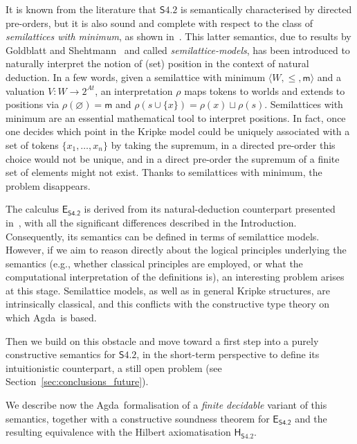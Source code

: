 \documentclass{article}
\newcommand{\logic}{\mathsf{S4.2}}
\newcommand{\eseq}{\mathsf{E}_{{\textsf{S4.2}}}}
\newcommand{\agda}{\textsf{Agda}}
\newcommand{\hilbertlogic}[1]{\mathsf{H}_{#1}}
\theoremstyle{definition}
\begin{document}
It is known from the literature that $\logic$ is semantically characterised by directed pre-orders, but it is also sound and complete with respect to the class of \emph{semilattices with minimum}, as shown in~\cite[Theorem~21]{Martini2024:S42NaturalDeduction}. This latter semantics, due to results by Goldblatt and Shehtmann~\cite{Goldblatt1980:Diodorean, Shehtman1983:ModalDomains} and called \emph{semilattice-models}, has been introduced to naturally interpret the notion of (set) position in the context of natural deduction.
In a few words, given a semilattice with minimum $\langle W, \leq, \mathsf{m} \rangle$ and a valuation $V : W \to 2^{At}$, an interpretation $\rho$ maps tokens to worlds and extends to positions via $\rho(\varnothing) = \mathsf{m}$ and $\rho(s \cup \{x\}) = \rho(x) \sqcup \rho(s)$. Semilattices with minimum are an essential mathematical tool to interpret positions. In fact, once one decides which point in the Kripke model could be uniquely associated with a set of tokens $\{x_1,\ldots,x_n\}$ by taking the supremum,
in a directed pre-order this choice would not be unique, and in a direct pre-order the supremum of a finite set of elements might not exist. Thanks to semilattices with minimum, the problem disappears.

The calculus $\eseq$ is derived from its natural-deduction counterpart presented in~\cite{Martini2024:S42NaturalDeduction}, with all the significant differences described in the Introduction. Consequently, its semantics can be defined in terms of semilattice models. However, if we aim to reason directly about the logical principles underlying the semantics (e.g., whether classical principles are employed, or what the computational interpretation of the definitions is), an interesting problem arises at this stage. Semilattice models, as well as in general Kripke structures, are intrinsically classical, and this conflicts with the constructive type theory on which \agda\ is based.

Then we build on this obstacle and move toward a first step into a purely constructive semantics for $\logic$, in the short-term perspective to define its intuitionistic counterpart, a still open problem (see Section~\ref{sec:conclusions_future}).

We describe now the \agda{}~formalisation of a \emph{finite decidable} variant of this semantics, together with a constructive soundness theorem for $\eseq$ and the resulting equivalence with the Hilbert axiomatisation $\hilbertlogic{\logic}$.
\end{document}
